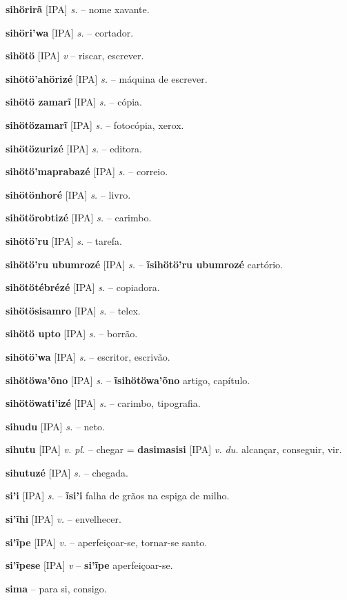 \textbf{sihörirã} [IPA] \textit{s.} -- nome xavante.

\textbf{sihöri'wa} [IPA] \textit{s.} -- cortador.

\textbf{sihötö} [IPA] \textit{v} -- riscar, escrever.

\textbf{sihötö'ahörizé} [IPA] \textit{s.} -- máquina de escrever.

\textbf{sihötö zamarĩ} [IPA] \textit{s.} -- cópia.

\textbf{sihötözamarĩ} [IPA] \textit{s.} -- fotocópia, xerox.

\textbf{sihötözurizé} [IPA] \textit{s.} -- editora.

\textbf{sihötö'maprabazé} [IPA] \textit{s.} -- correio.

\textbf{sihötönhoré} [IPA] \textit{s.} -- livro.

\textbf{sihötörobtizé} [IPA] \textit{s.} -- carimbo.

\textbf{sihötö'ru} [IPA] \textit{s.} -- tarefa.

\textbf{sihötö'ru ubumrozé} [IPA] \textit{s.} -- \textbf{ĩsihötö'ru ubumrozé} cartório.

\textbf{sihötötébrézé} [IPA] \textit{s.} -- copiadora.

\textbf{sihötösisamro} [IPA] \textit{s.} -- telex.

\textbf{sihötö upto} [IPA] \textit{s.} -- borrão.

\textbf{sihötö'wa} [IPA] \textit{s.} -- escritor, escrivão.

\textbf{sihötöwa'õno} [IPA] \textit{s.} -- \textbf{ĩsihötöwa'õno} artigo, capítulo.

\textbf{sihötöwati'izé} [IPA] \textit{s.} -- carimbo, tipografia.

\textbf{sihudu} [IPA] \textit{s.} -- neto.

\textbf{sihutu} [IPA] \textit{v. pl.} -- chegar = \textbf{dasimasisi} [IPA] \textit{v. du.} alcançar, conseguir, vir.

\textbf{sihutuzé} [IPA] \textit{s.} -- chegada.

\textbf{si'i} [IPA] \textit{s.} -- \textbf{ĩsi'i} falha de grãos na espiga de milho.

\textbf{si'ĩhi} [IPA] \textit{v.} -- envelhecer.

\textbf{si'ĩpe} [IPA] \textit{v.} -- aperfeiçoar-se, tornar-se santo.

\textbf{si'ĩpese} [IPA] \textit{v} -- \textbf{si'ĩpe} aperfeiçoar-se.

\textbf{sima} -- para si, consigo.

